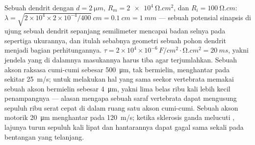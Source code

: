 \begin{example}\label{ex:b3:nervous-systems:numbers}
Sebuah dendrit dengan $d = \qty{2}{\micro m}$, $R_{m} = \qty{2e4}{\ohm.cm^2}$,
dan $R_{i} = \qty{100}{\ohm.cm}$: $\lambda = \sqrt{2\times 10^{4}\times
2\times 10^{-4}/400}\ \unit{cm} = \qty{0.1}{cm} = \qty{1}{mm}$ --- sebuah
potensial sinapsis di ujung sebuah dendrit sepanjang semilimeter mencapai
badan selnya pada sepertiga ukurannya, dan itulah sebabnya geometri sebuah
pohon dendrit menjadi bagian perhitungannya. $\tau = 2\times 10^{4}\times
10^{-6}\,\unit{F/cm^2}\cdot\unit{\ohm.cm^2} = \qty{20}{ms}$, yakni jendela
yang di dalamnya masukannya harus tiba agar terjumlahkan. Sebuah akson raksasa
cumi-cumi sebesar \qty{500}{\micro m}, tak bermielin, menghantar pada sekitar
\qty{25}{m/s}; untuk melakukan hal yang sama seekor vertebrata memakai sebuah
akson bermielin sebesar \qty{4}{\micro m}, yakni lima belas ribu kali lebih kecil
penampangnya --- alasan mengapa sebuah saraf vertebrata dapat mengusung sepuluh
ribu serat cepat di dalam ruang satu akson cumi-cumi. Sebuah akson motorik
\qty{20}{\micro m} menghantar pada \qty{120}{m/s}; ketika sklerosis ganda
melucuti , lajunya turun sepuluh kali lipat dan hantarannya dapat
gagal sama sekali pada bentangan yang telanjang.
\end{example}

